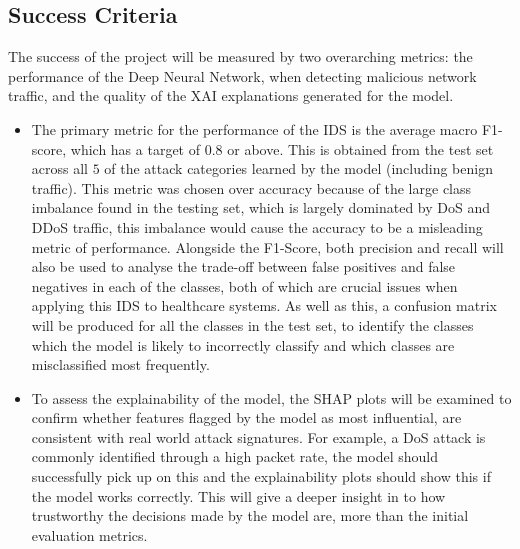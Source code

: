 \documentclass[11pt,a4paper]{article}
\begin{document}
\subsection{Success Criteria}
The success of the project will be measured by two overarching metrics: the performance of the Deep Neural Network, when detecting malicious network traffic, and the quality of the XAI explanations generated for the model.
\begin{itemize}
    \item The primary metric for the performance of the IDS is the average macro F1-score, which has a target of $0.8$ or above. This is obtained from the test set across all $5$ of the attack categories learned by the model (including benign traffic). This metric was chosen over accuracy because of the large class imbalance found in the testing set, which is largely dominated by DoS and DDoS traffic, this imbalance would cause the accuracy to be a misleading metric of performance. Alongside the F1-Score, both precision and recall will also be used to analyse the trade-off between false positives and false negatives in each of the classes, both of which are crucial issues when applying this IDS to healthcare systems. As well as this, a confusion matrix will be produced for all the classes in the test set, to identify the classes which the model is likely to incorrectly classify and which classes are misclassified most frequently.
    \item To assess the explainability of the model, the SHAP plots will be examined to confirm whether features flagged by the model as most influential, are consistent with real world attack signatures. For example, a DoS attack is commonly identified through a high packet rate, the model should successfully pick up on this and the explainability plots should show this if the model works correctly. This will give a deeper insight in to how trustworthy the decisions made by the model are, more than the initial evaluation metrics.
\end{itemize}
\end{document}
